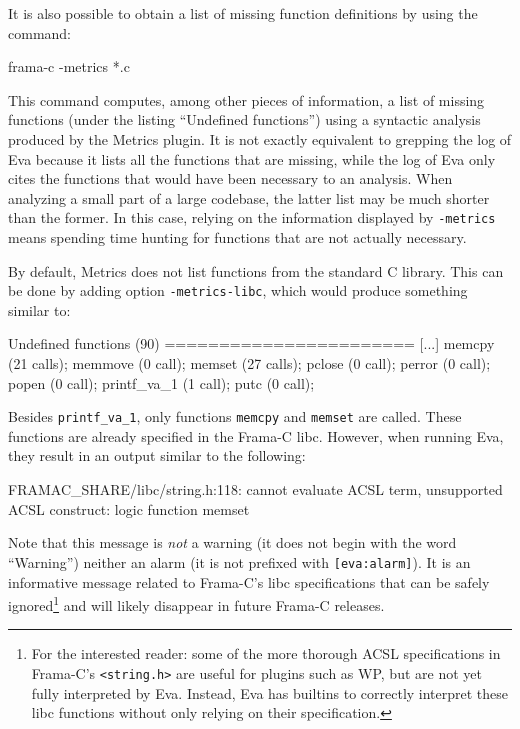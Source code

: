 \documentclass[web]{frama-c-book}
\newcommand{\Eva}{\textsf{Eva}}
\begin{document}
It is also possible to obtain a list of
missing function definitions by using the command:
\begin{listing-nonumber}
frama-c -metrics *.c
\end{listing-nonumber}
This command computes, among other pieces of information,
a list of missing functions (under the listing ``Undefined functions'')
using a syntactic analysis produced by the \textsf{Metrics} plugin.
It is not exactly equivalent to
grepping the log of \Eva{} because it lists
all the functions that are missing, while the log of
\Eva{} only cites the functions that would have
been necessary to an analysis. When
analyzing a small part of a large codebase, the latter list
may be much shorter than the former. 
In this case, relying on the information displayed by \lstinline|-metrics|
means spending time hunting for functions that are not actually
necessary.

By default, \textsf{Metrics} does not list functions from the standard C
library. This can be done by adding option \verb|-metrics-libc|, which would
produce something similar to:

\begin{logs}
Undefined functions (90)
=======================
[...]
memcpy (21 calls); memmove (0 call); memset (27 calls); pclose (0 call);
perror (0 call); popen (0 call); printf_va_1 (1 call); putc (0 call);
\end{logs}
Besides \verb|printf_va_1|, only functions \verb|memcpy| and \verb|memset|
are called. These functions are already specified in the Frama-C libc. However,
when running \Eva{}, they result in an output similar to the following:

\begin{logs}
[eva] FRAMAC_SHARE/libc/string.h:118:
  cannot evaluate ACSL term, unsupported ACSL construct: logic function memset
\end{logs}

Note that this message is {\em not} a warning (it does not begin with the word
``Warning'') neither an alarm (it is not prefixed with \verb|[eva:alarm]|). It
is an informative message related to Frama-C's libc specifications that can be
safely ignored\footnote{For the interested reader:
  some of the more thorough ACSL specifications in Frama-C's
  \texttt{<string.h>} are useful for plugins such as \textsf{WP},
  but are not yet fully interpreted by \Eva{}. Instead, \Eva{} has builtins to
  correctly interpret these libc functions without only relying on their
  specification.}
and will likely disappear in future Frama-C releases.
\end{document}
